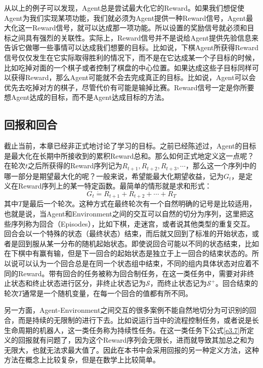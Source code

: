 \documentclass{ctexart}
\begin{document}
            从以上的例子可以发现，Agent总是尝试最大化它的Reward。如果我们想促使Agent为我们实现某项功能，我们就必须为Agent提供一种Reward信号，Agent最大化这一Reward信号，就可以达成那一项功能。所以设置的奖励信号就必须和目标之间具有强烈的关联性。实际上，Reward信号并不是说给Agent提供先验信息来告诉它做哪一些事情可以达成我们想要的目标。比如说，下棋Agent所获得Reward信号仅仅发生在它实际取得胜利的情况下，而不是在它达成某一个子目标的时候，比如吃掉对面的一个棋子或者控制了棋盘的中心位置。如果达成这些子目标同样可以获得Reward，那么Agent可能就不会去完成真正的目标。比如说，Agent可以会优先去吃掉对方的棋子，尽管代价有可能是输掉比赛。Reward信号一定是你所要想Agent达成的目标，而不是Agent达成目标的方法。

        \subsection{回报和回合}
            截止当前，本章已经非正式地讨论了学习的目标。之前已经陈述过，Agent的目标是最大化在长期中所接收到的累积Reward总和。那么如何正式地定义这一点呢？在轮次$t$之后所获得的Reward序列记为$R_{t+1},R_{t+2},R_{t+3},\cdots$，那么这一个序列中的哪一部分是期望最大化的呢？一般来说，希望能最大化期望收益，记为$G_t$，是定义在Reward序列上的某一特定函数。最简单的情形就是求和形式：
            \begin{equation}
                G_t \dot{=} R_{t+1} + R_{t+2} + \cdots + R_{T}
                \label{e3.7}
            \end{equation}
            其中$T$是最后一个轮次。这种方式在最终轮次有一个自然明确的记号是比较适用，也就是说，当Agent和Environment之间的交互可以自然的切分为序列，这里把这些序列称为回合（Episodes），比如下棋，走迷宫，或者说其他类型的重复交互。回合会以一个特殊的状态（最终状态）结束，而后就又回到了标准的开始状态，或者是回到服从某一分布的随机起始状态。即使说回合可能以不同的状态结束，比如在下棋中有赢有输，但是下一回合的起始状态是独立于上一回合的结束状态的。所以说可以认为一个回合总是在同一个状态组中结束，不同的组内具体状态对应着不同的Reward。带有回合的任务被称为回合制任务，在这一类任务中，需要对非终止状态和终止状态进行区分，非终止状态记为$\mathcal{S}$，而终止状态记为$\mathcal{S}^+$。回合结束的轮次$T$通常是一个随机变量，在每一个回合的值都有所不同。

            另一方面，Agent-Environment之间交互的很多案例不能自然地切分为可识别的回合，而是持续的无限制的进行下去。比如说运行当中的流程控制任务，或者说是长生命周期的机器人，这一类任务称为持续性任务。在这一类任务下公式\ref{e3.7}所定义的回报就有问题了，因为这个Reward序列会无限长，进而就导致其加总之和为无限大，也就无法求最大值了。因此在本书中会采用回报的另一种定义方法，这种方法在概念上比较复杂，但是在数学上比较简单。
\end{document}

